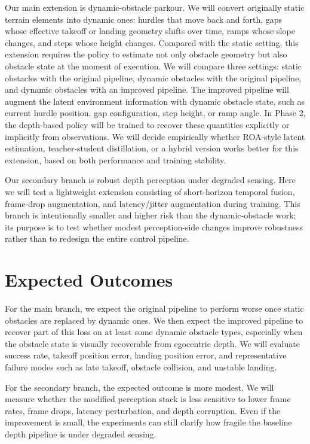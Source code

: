 \documentclass[conference]{IEEEtran}
\begin{document}
Our main extension is dynamic-obstacle parkour. We will convert originally static terrain elements into dynamic ones: hurdles that move back and forth, gaps whose effective takeoff or landing geometry shifts over time, ramps whose slope changes, and steps whose height changes. Compared with the static setting, this extension requires the policy to estimate not only obstacle geometry but also obstacle state at the moment of execution. We will compare three settings: static obstacles with the original pipeline, dynamic obstacles with the original pipeline, and dynamic obstacles with an improved pipeline. The improved pipeline will augment the latent environment information with dynamic obstacle state, such as current hurdle position, gap configuration, step height, or ramp angle. In Phase 2, the depth-based policy will be trained to recover these quantities explicitly or implicitly from observations. We will decide empirically whether ROA-style latent estimation, teacher-student distillation, or a hybrid version works better for this extension, based on both performance and training stability.

Our secondary branch is robust depth perception under degraded sensing. Here we will test a lightweight extension consisting of short-horizon temporal fusion, frame-drop augmentation, and latency/jitter augmentation during training. This branch is intentionally smaller and higher risk than the dynamic-obstacle work; its purpose is to test whether modest perception-side changes improve robustness rather than to redesign the entire control pipeline.

\section{Expected Outcomes}
For the main branch, we expect the original pipeline to perform worse once static obstacles are replaced by dynamic ones. We then expect the improved pipeline to recover part of this loss on at least some dynamic obstacle types, especially when the obstacle state is visually recoverable from egocentric depth. We will evaluate success rate, takeoff position error, landing position error, and representative failure modes such as late takeoff, obstacle collision, and unstable landing.

For the secondary branch, the expected outcome is more modest. We will measure whether the modified perception stack is less sensitive to lower frame rates, frame drops, latency perturbation, and depth corruption. Even if the improvement is small, the experiments can still clarify how fragile the baseline depth pipeline is under degraded sensing.
\end{document}
